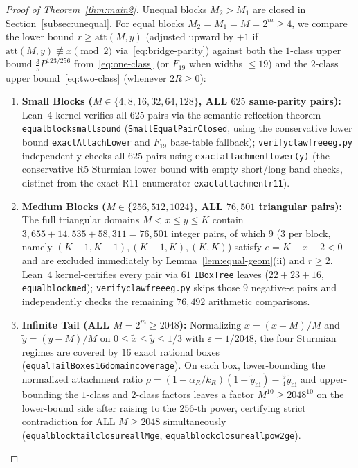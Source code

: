 \documentclass[11pt,reqno]{amsart}
\theoremstyle{plain}
\theoremstyle{definition}
\theoremstyle{remark}
\DeclareRobustCommand{\_}{\ifmmode\text{\textunderscore}\else\textunderscore\allowbreak\fi}
\begin{document}
\begin{proof}[Proof of Theorem~\ref{thm:main2}]
Unequal blocks $M_2 > M_1$ are closed in Section~\ref{subsec:unequal}. For equal blocks $M_2 = M_1 = M = 2^m \ge 4$, we compare the lower bound $r \ge \mathrm{att}(M, y)$ (adjusted upward by $+1$ if $\mathrm{att}(M, y) \not\equiv x \pmod{2}$ via~\eqref{eq:bridge-parity}) against both the $1$-class upper bound $\frac{3}{5} P^{123/256}$ from~\eqref{eq:one-class} (or $F_{19}$ when widths $\le 19$) and the $2$-class upper bound~\eqref{eq:two-class} (whenever $2R \ge 0$):
\begin{enumerate}[label=(\arabic*),leftmargin=2em]
  \item \textbf{Small Blocks ($M \in \{4, 8, 16, 32, 64, 128\}$, ALL $625$ same-parity pairs):} Lean~4 kernel-verifies all $625$ pairs via the semantic reflection theorem \texttt{equal\_block\_small\_625\_sound} (\texttt{SmallEqualPairClosed}, using the conservative lower bound \texttt{exactAttachLower} and $F_{19}$ base-table fallback); \texttt{verify\_clawfree\_eg.py} independently checks all $625$ pairs using \texttt{exact\_attachment\_lower(y)} (the conservative R5 Sturmian lower bound with empty short/long band checks, distinct from the exact R11 enumerator \texttt{exact\_attachment\_r11}).
  \item \textbf{Medium Blocks ($M \in \{256, 512, 1024\}$, ALL $76{,}501$ triangular pairs):} The full triangular domains $M < x \le y \le K$ contain $3{,}655 + 14{,}535 + 58{,}311 = 76{,}501$ integer pairs, of which $9$ ($3$ per block, namely $(K-1, K-1), (K-1, K), (K, K)$) satisfy $e = K - x - 2 < 0$ and are excluded immediately by Lemma~\ref{lem:equal-geom}(ii) and $r \ge 2$. Lean~4 kernel-certifies every pair via $61$ \texttt{IBoxTree} leaves ($22 + 23 + 16$, \texttt{equal\_block\_med\_256\_512\_1024}); \texttt{verify\_clawfree\_eg.py} skips those $9$ negative-$e$ pairs and independently checks the remaining $76{,}492$ arithmetic comparisons.
  \item \textbf{Infinite Tail (ALL $M = 2^m \ge 2048$):} Normalizing $\tilde{x} = (x - M)/M$ and $\tilde{y} = (y - M)/M$ on $0 \le \tilde{x} \le \tilde{y} \le 1/3$ with $\varepsilon = 1/2048$, the four Sturmian regimes are covered by $16$ exact rational boxes (\texttt{equalTailBoxes16\_domain\_coverage}). On each box, lower-bounding the normalized attachment ratio $\rho = (1 - \alpha_R/k_R)(1 + \tilde{y}_{\mathrm{hi}}) - \frac{9}{4}\tilde{y}_{\mathrm{hi}}$ and upper-bounding the $1$-class and $2$-class factors leaves a factor $M^{10} \ge 2048^{10}$ on the lower-bound side after raising to the $256$-th power, certifying strict contradiction for ALL $M \ge 2048$ simultaneously (\texttt{equal\_block\_tail\_closure\_all\_M\_ge\_2048}, \texttt{equal\_block\_closure\_all\_pow2\_ge\_256}). \qedhere
\end{enumerate}
\end{proof}
\end{document}
